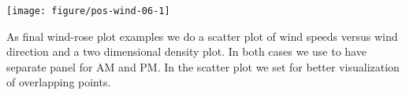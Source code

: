 \documentclass[krantz2]{krantz}\usepackage{knitr}%
\begin{document}
\begin{knitrout}\footnotesize
{}\color{fgcolor}\begin{kframe}
\begin{alltt}
   \hlopt{+}
  \hlstd{()} \hlopt{+}
  \hlstd{(} \hlstd{=} \hlstd{,}  \hlstd{=} \hlstd{,}  \hlstd{=} \hlstd{,}  \hlstd{=} \hlstd{)} \hlopt{+}
  \hlstd{(} \hlstd{=} \hlstd{(}\hlstd{,} \hlstd{,} \hlstd{,} \hlstd{),}
                      \hlstd{=} \hlstd{(}\hlstd{,} \hlstd{,} \hlstd{,} \hlstd{),}
                      \hlstd{=} \hlstd{(}\hlstd{,} \hlstd{),}
                      \hlstd{=} \hlstd{(}\hlstd{,} \hlstd{),}
                      \hlstd{=} \hlstd{)} \hlopt{+}
  \hlstd{(} \hlstd{=} \hlstd{)}
\end{alltt}
\end{kframe}

{\centering \texttt{[image: figure/pos-wind-06-1]} 

}



\end{knitrout}

As final wind-rose plot examples we do a scatter plot of wind speeds versus wind direction and a two dimensional density plot. In both cases we use  to have separate panel for AM and PM. In the scatter plot we set  for better visualization of overlapping points.
\end{document}

